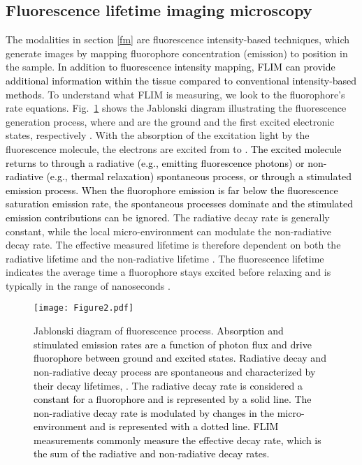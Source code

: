 \documentclass[12pt]{iopart}
\newcommand{\cc}[1]{\textcolor{black}{#1}}
\begin{document}
\subsection{Fluorescence lifetime imaging microscopy} \label{flim}
The modalities in section \ref{fm} are fluorescence intensity-based techniques, which generate images by mapping fluorophore concentration (emission) to position in the sample. \cc{In addition to fluorescence intensity mapping, FLIM can provide additional information within the tissue compared to conventional intensity-based methods.} To understand what FLIM is measuring, we look to the fluorophore's rate equations. Fig.~\ref{Jab_diag} shows the Jablonski diagram illustrating the fluorescence generation process, where  and  are the ground and the first excited electronic states, respectively \cite{FLIM2007}. With the absorption of the excitation light by the fluorescence molecule, the electrons are excited from  to . \cc{The excited molecule returns to  through a radiative (e.g., emitting fluorescence photons) or non-radiative (e.g., thermal relaxation) spontaneous process, or through a stimulated emission process. When the fluorophore emission is far below the fluorescence saturation emission rate, the spontaneous processes dominate and the stimulated emission contributions can be ignored.} The radiative decay rate is generally constant, while the local micro-environment can modulate the non-radiative decay rate. The effective measured lifetime  is therefore dependent on both the radiative lifetime  and the non-radiative lifetime . The fluorescence lifetime indicates the average time a fluorophore stays excited before relaxing and is typically in the range of nanoseconds \cite{Confocal_Handbook, FluorescenceLifetimeMeasurements}.

\begin{figure}[!t]
	\centering
	\texttt{[image: Figure2.pdf]}
	\caption{Jablonski diagram of fluorescence process. \cc{Absorption and stimulated emission rates are a function of photon flux and drive fluorophore between ground and excited states. Radiative decay and non-radiative decay process are spontaneous and characterized by their decay lifetimes, . The radiative decay rate is considered a constant for a fluorophore and is represented by a solid line. The non-radiative decay rate is modulated by changes in the micro-environment and is represented with a dotted line. FLIM measurements commonly measure the effective decay rate, which is the sum of the radiative and non-radiative decay rates.}}
	\label{Jab_diag}
\end{figure}
\end{document}
